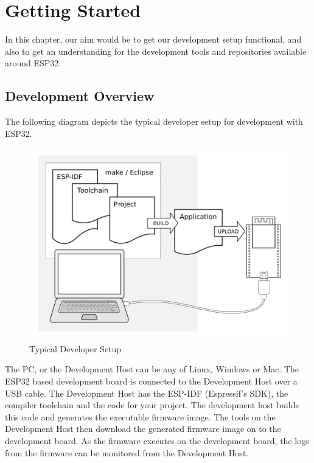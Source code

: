 \documentclass[main.tex]{subfiles}
\begin{document}
\chapter{Getting Started}

In this chapter, our aim would be to get our development setup functional, and also to get an understanding for the development tools and repositories available around ESP32.

\section{Development Overview}

The following diagram depicts the typical developer setup for development with ESP32.
\begin{figure}[h]
    \centering
    \includegraphics[scale=0.6]{../../_static/dev_setup.png}
    \caption{Typical Developer Setup}
    \label{fig:dev_setup}
\end{figure}

The PC, or the Development Host can be any of Linux, Windows or Mac. The ESP32 based development board is connected to the Development Host over a USB cable. The Development Host has the ESP-IDF (Espressif's SDK), the compiler toolchain and the code for your project. The development host builds this code and generates the executable firmware image. The tools on the Development Host then download the generated firmware image on to the development board. As the firmware executes on the development board, the logs from the firmware can be monitored from the Development Host.
\end{document}
